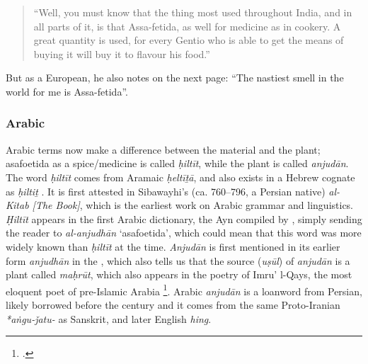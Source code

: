 \begin{quote}
    ``Well, you must know that the thing most used throughout India, and in all parts of it, is that Assa-fetida, as well for medicine as in cookery. A great quantity is used, for every Gentio who is able to get the means of buying it will buy it to flavour his food.'' \autocite[44]{garcia_da_orta_colloquies_1913}
\end{quote}

But as a European, he also notes on the next page: ``The nastiest smell in the world for me is Assa-fetida''.



\subsubsection{Arabic}



Arabic terms now make a difference between the material and the plant; asafoetida as a spice/medicine is called 
\textit{ḥiltīt}, while the plant is called  \textit{anjudān}.
The word \textit{ḥiltīt} comes from Aramaic  \textit{ḥeltīṯā}, and also exists in a Hebrew cognate as  \textit{ḥiltiṯ}
\autocites[140]{fraenkel_aramaischen_1886}[36]{low_aramaeische_1881}[Vol. 3, p. 452-455]{low_flora_1924}. It is first attested in Sibawayhi's (ca. 760--796, a Persian native) \textit{al-Kitab [The Book]}, which is the earliest work on Arabic grammar and linguistics. \textit{Ḥiltīt} appears in the first Arabic dictionary, the \gls{Ayn} compiled by \textcite{al-farahidi_kitab_786}, simply sending the reader to \textit{al-anjudhān} `asafoetida', which could mean that this word was more widely known than \textit{ḥiltīt} at the time. \textit{Anjudān} is first mentioned in its earlier form  
\textit{anjudhān} in the , which also tells us that the source (\textit{u\d{s}\={u}l}) of \textit{anjudān} is a plant called \textit{maḥrūt}, which also appears in the poetry of Imru' l-Qays, the most eloquent poet of pre-Islamic Arabia \footcite[see][819]{ibn_manzur_lisan_1979}. Arabic \textit{anjudān} is a loanword from Persian, likely borrowed before the  century and it comes from the same Proto-Iranian \textit{*aṅgu-ǰatu-} as Sanskrit, and later English \textit{hing}.





